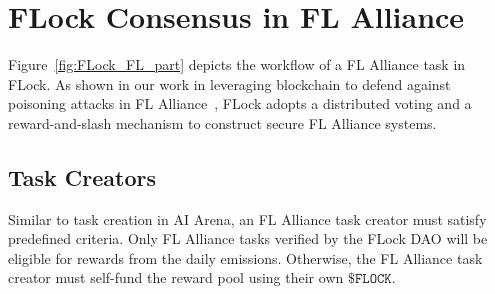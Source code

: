 \documentclass[conference]{IEEEtran}
\newcommand{\FL}{\ac{FL} Alliance\xspace}
\newcommand{\SNT}{{AI Arena}\xspace}
\newcommand{\VRF}{\ac{VRF}\xspace}
\newcommand{\FML}{\ensuremath{\xspace\texttt{\$FLOCK}}\xspace}
\begin{document}
\section{FLock Consensus in \FL}
Figure~\ref{fig:FLock_FL_part} depicts the workflow of a \FL task in FLock. As shown in our work in leveraging blockchain to defend against poisoning attacks in \FL~\cite{dong2023defending}, FLock adopts a distributed voting and a reward-and-slash mechanism to construct secure \FL systems.




\subsection{Task Creators}
Similar to task creation in \SNT, an \FL task creator must satisfy predefined criteria. Only \FL tasks verified by the FLock DAO will be eligible for rewards from the daily emissions. Otherwise, the \FL task creator must self-fund the reward pool using their own \FML.


\end{document}
